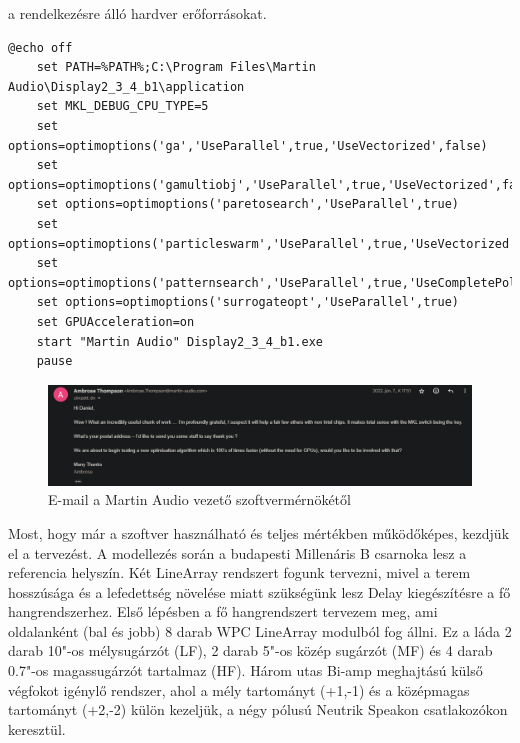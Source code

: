a rendelkezésre álló hardver erőforrásokat.
\begin{lstlisting}[caption={A Display 2.3.4 b1 indító ".bat" scriptje AMD Ryzen processzorokhoz}, label=batcode, xleftmargin=\parindent]
    @echo off
    set PATH=%PATH%;C:\Program Files\Martin Audio\Display2_3_4_b1\application
    set MKL_DEBUG_CPU_TYPE=5
    set options=optimoptions('ga','UseParallel',true,'UseVectorized',false)
    set options=optimoptions('gamultiobj','UseParallel',true,'UseVectorized',false)
    set options=optimoptions('paretosearch','UseParallel',true)
    set options=optimoptions('particleswarm','UseParallel',true,'UseVectorized',false)
    set options=optimoptions('patternsearch','UseParallel',true,'UseCompletePoll',true,'UseVectorized',false)
    set options=optimoptions('surrogateopt','UseParallel',true)
    set GPUAcceleration=on
    start "Martin Audio" Display2_3_4_b1.exe
    pause
\end{lstlisting}
\begin{figure}[H]
	\centering
	\includegraphics[width=\textwidth, keepaspectratio]{figures/ambrose_email.png}
	\caption{E-mail a Martin Audio vezető szoftvermérnökétől}
	\label{fig:ambrose_email}
\end{figure}
Most, hogy már a szoftver használható és teljes mértékben működőképes, kezdjük el a tervezést.
A modellezés során a budapesti Millenáris B csarnoka lesz a referencia helyszín. Két LineArray rendszert fogunk
tervezni, mivel a terem hosszúsága és a lefedettség növelése miatt szükségünk lesz Delay kiegészítésre a fő hangrendszerhez.
Első lépésben a fő hangrendszert tervezem meg, ami oldalanként (bal és jobb) 8 darab WPC LineArray modulból fog állni.
Ez a láda 2 darab 10"-os mélysugárzót (LF), 2 darab 5"-os közép sugárzót (MF) és 4 darab 0.7"-os magassugárzót tartalmaz (HF).
Három utas Bi-amp meghajtású külső végfokot igénylő rendszer, ahol a mély tartományt (+1,-1) és a középmagas tartományt (+2,-2) külön kezeljük,
a négy pólusú Neutrik Speakon csatlakozókon keresztül.
